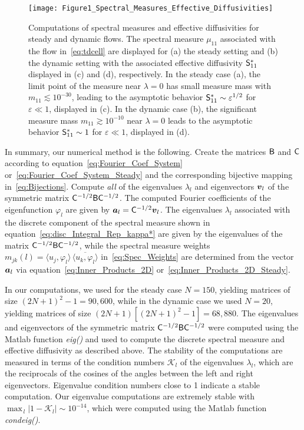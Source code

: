 \documentclass[amsa]{ipart}
\begin{document}
%
\begin{figure}[t]
  \centerline{\texttt{[image: Figure1\_Spectral\_Measures\_Effective\_Diffusivities]}} 
\caption{%
  Computations of spectral measures and effective diffusivities for
  steady and dynamic flows. The spectral measure $\mu_{11}$ associated
  with the flow in~\eqref{eq:tdcell} are displayed for (a) the steady
  setting and (b) the dynamic setting with the associated effective
  diffusivity $\mathsf{S}^*_{11}$ displayed in (c) and (d), respectively. In
  the steady case (a), the 
  limit point of the measure near $\lambda=0$ has small measure mass with
  $m_{11}\lesssim10^{-30}$, leading to the asymptotic behavior
  $\mathsf{S}^*_{11}\sim\varepsilon^{1/2}$ for $\varepsilon\ll1$, displayed in (c). In the dynamic case
  (b), the significant measure mass $m_{11}\gtrsim10^{-10}$
  near $\lambda=0$ leads to the asymptotic behavior
  $\mathsf{S}^*_{11}\sim1$ for $\varepsilon\ll1$, displayed in (d).
        }
\label{fig:Fig1_Spect_Meas_Eff_Diffus}
\end{figure}
%


In summary, our numerical method is the following. Create the matrices
$\mathsf{B}$ and $\mathsf{C}$ according to equation~\eqref{eq:Fourier_Coef_System}
or~\eqref{eq:Fourier_Coef_System_Steady} and the corresponding
bijective mapping in~\eqref{eq:Bijections}. Compute \emph{all} of the
eigenvalues $\lambda_l$ and eigenvectors $\boldsymbol{v}_l$ of the symmetric matrix
$\mathsf{C}^{-1/2}\mathsf{B}\mathsf{C}^{-1/2}$. The computed Fourier coefficients of the
eigenfunction $\varphi_l$ are given by 
$\boldsymbol{a}_l=\mathsf{C}^{-1/2}\boldsymbol{v}_l$. The eigenvalues $\lambda_l$ associated with the
discrete component of the spectral measure shown in
equation~\eqref{eq:disc_Integral_Rep_kappa*} are given by the
eigenvalues of the matrix $\mathsf{C}^{-1/2}\mathsf{B}\mathsf{C}^{-1/2}$, while the
spectral measure weights $m_{jk}(l)=\langle u_j,\varphi_l\rangle\,\overline{\langle u_k,\varphi_l\rangle}$
in~\eqref{eq:Spec_Weights} are determined from the vector $\boldsymbol{a}_l$
via equation~\eqref{eq:Inner_Products_2D}
or~\eqref{eq:Inner_Products_2D_Steady}.      



In our computations, we used for the steady case $N=150$, yielding
matrices of size $(2N+1)^2-1=90,600$, while in the dynamic case we used
$N=20$, yielding matrices of size $(2N+1)[(2N+1)^2-1]=68,880$. The
eigenvalues and eigenvectors of the symmetric matrix 
$\mathsf{C}^{-1/2}\mathsf{B}\mathsf{C}^{-1/2}$ were computed using the Matlab function
\emph{eig()} and used to compute the discrete spectral measure and
effective diffusivity as described above. The stability of the
computations are measured in terms of the condition numbers
$\mathcal{K}_l$ of the eigenvalues $\lambda_l$, 
which are the reciprocals of the cosines of the angles between the
left and right eigenvectors. Eigenvalue condition numbers close to 1
indicate a stable computation. Our eigenvalue computations are
extremely stable with $\max_{\,l}|1-\mathcal{K}_l|\sim10^{-14}$, which were
computed using the Matlab function \emph{condeig()}.
\end{document}
